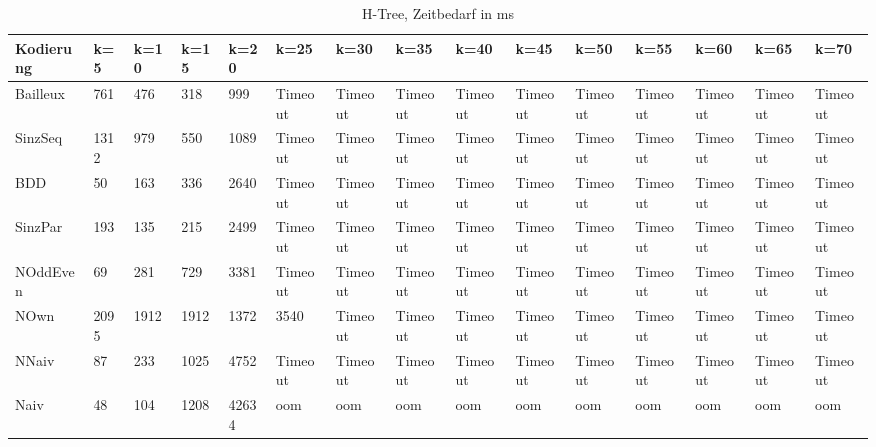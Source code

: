 \documentclass[a4,abstract=on]{scrartcl}
\begin{document}
\begin{landscape}
 \begin{table}[h!]
    \small
    \setlength{\tabcolsep}{0.11cm}
     \centering
     \begin{tabular}[width=\textwidth]{|l||l|l|l|l|l|l|l|l|l|l|l|l|l|l|}
	\hline
       \textbf{Kodierung}  & \textbf{k=5} & \textbf{k=10} & \textbf{k=15} &\textbf{k=20} &\textbf{k=25} &\textbf{k=30} &\textbf{k=35} &\textbf{k=40} &\textbf{k=45} &\textbf{k=50} &\textbf{k=55} &\textbf{k=60} &\textbf{k=65} &\textbf{k=70}\\
	\hline
	\hline
	Bailleux & 761 & 476 & 318 & 999 & Timeout & Timeout & Timeout & Timeout & Timeout & Timeout & Timeout & Timeout & Timeout & Timeout\\
\hline
	SinzSeq & 1312 & 979 & 550 & 1089 & Timeout & Timeout & Timeout & Timeout & Timeout & Timeout & Timeout & Timeout & Timeout & Timeout \\
\hline
	BDD & 50 & 163 & 336 & 2640 & Timeout & Timeout & Timeout &Timeout &Timeout &Timeout & Timeout & Timeout & Timeout & Timeout\\
\hline
	SinzPar & 193 & 135 & 215 & 2499 & Timeout & Timeout & Timeout & Timeout & Timeout & Timeout & Timeout & Timeout & Timeout & Timeout \\
\hline
	NOddEven & 69 & 281 & 729 & 3381 & Timeout & Timeout & Timeout & Timeout & Timeout & Timeout& Timeout & Timeout & Timeout & Timeout\\
\hline
	NOwn & 2095 & 1912 & 1912 & 1372 & 3540 & Timeout& Timeout & Timeout & Timeout & Timeout & Timeout & Timeout & Timeout & Timeout\\
 \hline
	NNaiv & 87 & 233 & 1025 & 4752 & Timeout & Timeout & Timeout & Timeout & Timeout & Timeout & Timeout & Timeout & Timeout & Timeout\\
\hline
	Naiv & 48 & 104 &  1208 &  42634 &  oom &  oom &  oom &  oom &  oom &  oom &  oom &  oom &  oom &  oom\\
\hline
       
     \end{tabular}

     \caption{H-Tree, Zeitbedarf in ms}
     \label{tbl:beispieltabelle}

   \end{table}



\end{landscape}
\end{document}
